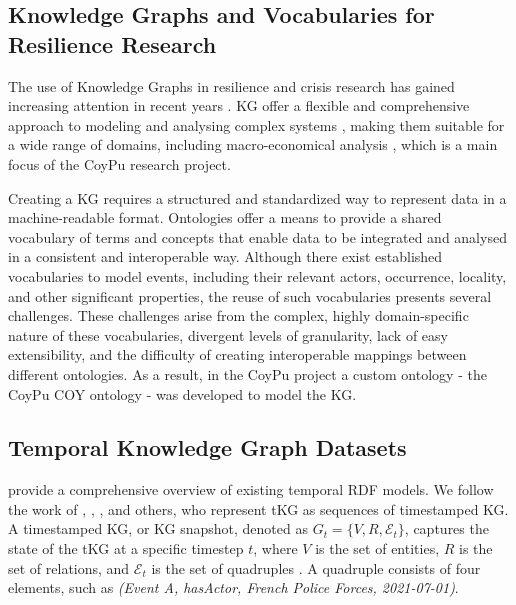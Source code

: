 \subsection{Knowledge Graphs and Vocabularies for Resilience Research}
The use of Knowledge Graphs in resilience and crisis research has gained increasing attention in recent years \cite{Kim2022}. KG offer a flexible and comprehensive approach to modeling and analysing complex systems \cite{TILLY2021115765}, making them suitable for a wide range of domains, including macro-economical analysis \cite{Yang2020}, which is a main focus of the CoyPu research project.

Creating a KG requires a structured and standardized way to represent data in a machine-readable format. Ontologies offer a means to provide a shared vocabulary of terms and concepts that enable data to be integrated and analysed in a consistent and interoperable way. Although there exist established vocabularies \cite{Crofts2011} to model events, including their relevant actors, occurrence, locality, and other significant properties, the reuse of such vocabularies presents several challenges. These challenges arise from the complex, highly domain-specific nature of these vocabularies, divergent levels of granularity, lack of easy extensibility, and the difficulty of creating interoperable mappings between different ontologies. As a result, in the CoyPu project a custom ontology - the CoyPu COY ontology \cite{coy_2023} - was developed to model the KG.

\subsection{Temporal Knowledge Graph Datasets}  
\citet{Zhang2021} provide a comprehensive overview of existing temporal RDF models. We follow the work of \citet{Trivedi2017}, \citet{Li2021regcn}, \citet{Han2021xerte}, and others, who represent tKG as sequences of timestamped KG. A timestamped KG, or KG snapshot, denoted as $G_t = \{V,R, \mathcal{E}_t\}$, captures the state of the tKG at a specific timestep $t$, where $V$ is the set of entities, $R$ is the set of relations, and $\mathcal{E}_t$ is the set of quadruples \cite{Li2021regcn}. A quadruple consists of four elements, such as \textit{(Event A, hasActor, French Police Forces, 2021-07-01)}. 


